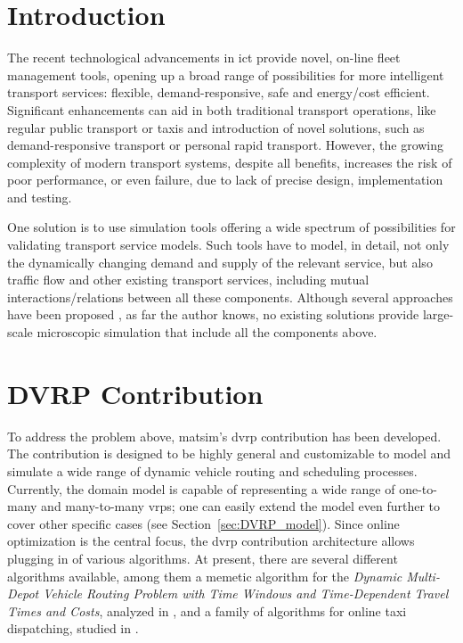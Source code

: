 \section{Introduction}
The recent technological advancements in \gls{ict} provide novel, on-line fleet management tools, opening up a broad range of possibilities for more intelligent transport services: flexible, demand-responsive, safe and energy/cost efficient. Significant enhancements can aid in both traditional transport operations, like regular public transport or taxis and introduction of novel solutions, such as demand-responsive transport or personal rapid transport. However, the growing complexity of modern transport systems, despite all benefits, increases the risk of poor performance, or even failure, due to lack of precise design, implementation and testing.

One solution is to use simulation tools offering a wide spectrum of possibilities for validating transport service models. Such tools have to model, in detail, not only the dynamically changing demand and supply of the relevant service, but also traffic flow and other existing transport services, including mutual interactions/relations between all these components. Although several approaches have been proposed \citep[e.g.,][]{ReganMahmassaniJaillet1998DynamicFleetManagementSimulation, BarceloEtc2007RoutingSchedulingSimulationLogistics, LiaoEtc2008ObjOrFramework4DVRP,Certicky:2014:AST:2615731.2616118}, as far the author knows, no existing solutions provide large-scale microscopic simulation that include all the components above.

\section{DVRP Contribution}
To address the problem above, \gls{matsim}'s \gls{dvrp} \gls{contribution} has been developed. The \gls{contribution} is designed to be highly general and customizable to model and simulate a wide range of dynamic vehicle routing and scheduling processes. Currently, the domain model is capable of representing a wide range of one-to-many and many-to-many \glspl{vrp}; one can easily extend the model even further to cover other specific cases (see Section~\ref{sec:DVRP_model}). Since online optimization is the central focus, the \gls{dvrp} contribution architecture allows plugging in of various algorithms. At present, there are several different algorithms available, among them a memetic  algorithm for the \emph{Dynamic Multi-Depot Vehicle Routing Problem with Time Windows and Time-Dependent Travel Times and Costs}, analyzed in \citep{MaciejewskiNagel2012DVRPMatsimPPAM}, and a family of algorithms for online taxi dispatching, studied in \citep{ MaciejewskiNagelOnlineTaxis2, MaciejewskiNagel2013OnlineTaxisVSPWP, MaciejewskiNagel2013CooperationPPAM, Maciejewski2014OnlineViaOffline}.

